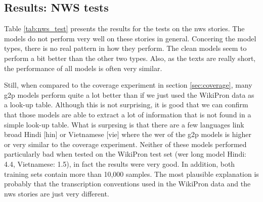 
\subsection{Results: NWS tests}
Table \ref{tab:nws_test} presents the results for the tests on the \ac{nws} stories. The models do not perform very well on these stories in general. Concering the model types, there is no real pattern in how they perform. The clean models seem to perform a bit better than the other two types. Also, as the texts are really short, the performance of all models is often very similar.

Still, when compared to the coverage experiment in section \ref{sec:coverage}, many \ac{g2p} models perform quite a lot better than if we just used the WikiPron data as a look-up table. Although this is not surprising, it is good that we can confirm that those models are able to extract a lot of information that is not found in a simple look-up table. What is surprsing is that there are a few languages link broad Hindi [hin] or Vietnamese [vie] where the \ac{wer} of the \ac{g2p} models is higher or very similar to the coverage experiment. Neither of these models performed particularly bad when tested on the WikiPron test set (\ac{wer} long model Hindi: 4.4, Vietnamese: 1.5), in fact the results were very good. In addition, both training sets contain more than 10,000 samples. The most plausible explanation is probably that the transcription conventions used in the WikiPron data and the \ac{nws} stories are just very different.  

